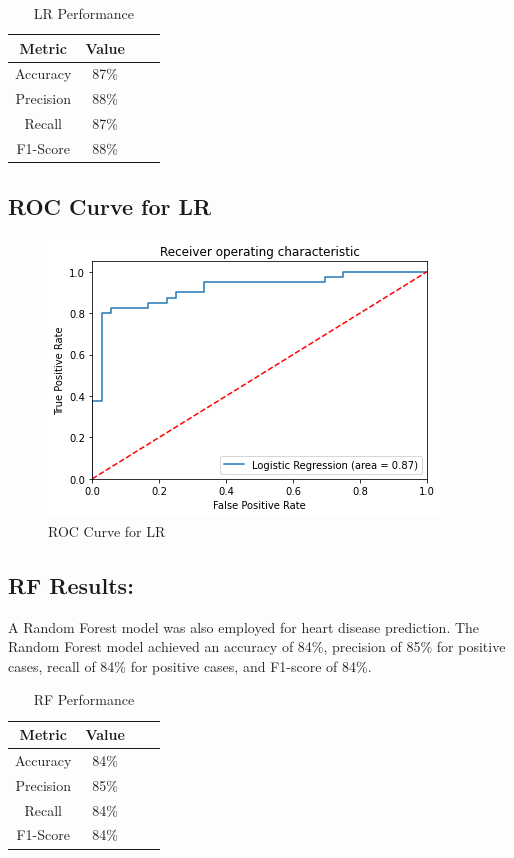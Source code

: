 \begin{table}[h!]
    \centering
    \caption{LR Performance}
    \label{tab:_ex_tab}
    \begin{tabular}{cccc}     
        \toprule
             Metric  & Value\\
        \midrule
            Accuracy  & 87\% \\
           Precision & 88\% \\
           Recall  & 87\% \\
           F1-Score & 88\% \\ 
        \bottomrule
    \end{tabular}
\end{table}

\subsection{ROC Curve for LR}

\begin{figure}[H]
    \centering
    \includegraphics[width=0.5\linewidth]{LR.png}
    \caption{ROC Curve for LR}
    \label{LR}
\end{figure}

\subsection{RF Results:}
A Random Forest model was also employed for heart disease prediction. The Random Forest model achieved an accuracy of 84\%, precision of 85\% for positive cases, recall of 84\% for positive cases, and F1-score of 84\%.


\begin{table}[h!]
    \centering
    \caption{RF Performance}
    \label{tab:_ex_tab}
    \begin{tabular}{cccc}     
        \toprule
             Metric  & Value\\
        \midrule
            Accuracy  & 84\% \\
           Precision & 85\% \\
           Recall  & 84\% \\
           F1-Score & 84\% \\ 
        \bottomrule
    \end{tabular}
\end{table}

